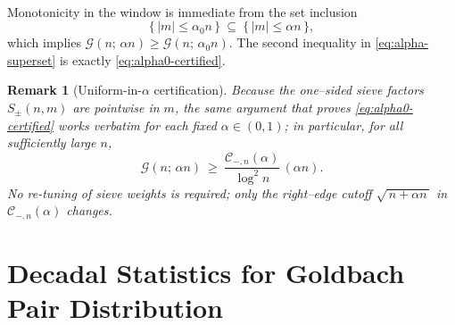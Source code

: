 \documentclass[11pt]{article}
\makeatletter
\theoremstyle{inline}
\newtheorem*{remark}{Remark}
\theoremstyle{break}
\renewenvironment{proof}[1][\proofname]{%
  \par\pushQED{\qed}%
  \normalfont \topsep6\p@\@plus6\p@\relax
  \trivlist
  \item[\hskip\labelsep
        \itshape
    #1\@addpunct{.}]\mbox{}\\  %
}{%
  \popQED\endtrivlist\@endpefalse
}
\theoremstyle{break}
\theoremstyle{break}
\theoremstyle{break}
\theoremstyle{break}
\theoremstyle{break}
\theoremstyle{break}
\theoremstyle{inline}
\newcommand{\CminusProductAlpha}[2]{\mathcal{C}_{-,#2}\!\left(#1\right)}
\makeatother
\begin{document}
\begin{proof}
Monotonicity in the window is immediate from the set inclusion
\begin{equation}\label{eq:window-inclusion}
\{\,|m|\le \alpha_0 n\,\}\ \subseteq\ \{\,|m|\le \alpha n\,\},
\end{equation}
which implies \(\mathcal G(n;\,\alpha n)\ge \mathcal G(n;\,\alpha_0 n)\). The second inequality in \eqref{eq:alpha-superset} is exactly \eqref{eq:alpha0-certified}.
\end{proof}

\begin{remark}[Uniform-in-\(\alpha\) certification]
\label{rem:alpha-uniform}
Because the one–sided sieve factors \(S_\pm(n,m)\) are pointwise in \(m\), the same argument that proves \eqref{eq:alpha0-certified} works verbatim for each fixed \(\alpha\in(0,1)\); in particular, for all sufficiently large \(n\),
\begin{equation}\label{eq:alpha-uniform}
\mathcal G(n;\,\alpha n)\ \ge\ \frac{\CminusProductAlpha{\alpha}{n}}{\log^2 n}\,(\alpha n).
\end{equation}
No re-tuning of sieve weights is required; only the right–edge cutoff \(\sqrt{\,n+\alpha n\,}\) in \(\CminusProductAlpha{\alpha}{n}\) changes.
\end{remark}


\clearpage

\section{Decadal Statistics for Goldbach Pair Distribution}\label{app:decadal}


\setlength{\LTpre}{0pt}
\setlength{\LTpost}{0pt}
\end{document}
